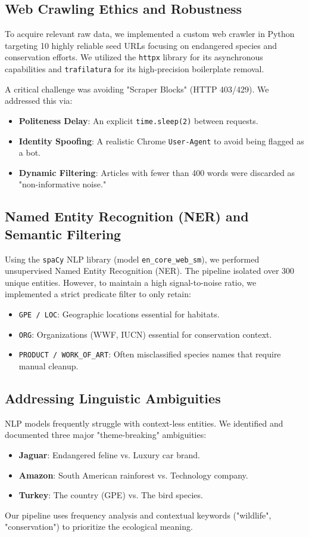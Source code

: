 \documentclass[11pt]{article}
\begin{document}
\subsection{Web Crawling Ethics and Robustness}
To acquire relevant raw data, we implemented a custom web crawler in Python targeting 10 highly reliable seed URLs focusing on endangered species and conservation efforts. We utilized the \texttt{httpx} library for its asynchronous capabilities and \texttt{trafilatura} for its high-precision boilerplate removal.

A critical challenge was avoiding "Scraper Blocks" (HTTP 403/429). We addressed this via:
\begin{itemize}
    \item \textbf{Politeness Delay}: An explicit \texttt{time.sleep(2)} between requests.
    \item \textbf{Identity Spoofing}: A realistic Chrome \texttt{User-Agent} to avoid being flagged as a bot.
    \item \textbf{Dynamic Filtering}: Articles with fewer than 400 words were discarded as "non-informative noise."
\end{itemize}

\subsection{Named Entity Recognition (NER) and Semantic Filtering}
Using the \texttt{spaCy} NLP library (model \texttt{en\_core\_web\_sm}), we performed unsupervised Named Entity Recognition (NER). The pipeline isolated over 300 unique entities. However, to maintain a high signal-to-noise ratio, we implemented a strict predicate filter to only retain:
\begin{itemize}
    \item \texttt{GPE / LOC}: Geographic locations essential for habitats.
    \item \texttt{ORG}: Organizations (WWF, IUCN) essential for conservation context.
    \item \texttt{PRODUCT / WORK\_OF\_ART}: Often misclassified species names that require manual cleanup.
\end{itemize}

\subsection{Addressing Linguistic Ambiguities}
NLP models frequently struggle with context-less entities. We identified and documented three major "theme-breaking" ambiguities:
\begin{itemize}
    \item \textbf{Jaguar}: Endangered feline vs. Luxury car brand.
    \item \textbf{Amazon}: South American rainforest vs. Technology company.
    \item \textbf{Turkey}: The country (GPE) vs. The bird species.
\end{itemize}
Our pipeline uses frequency analysis and contextual keywords ("wildlife", "conservation") to prioritize the ecological meaning.
\end{document}
